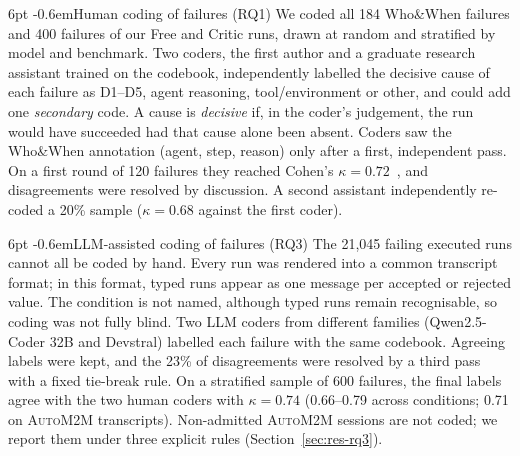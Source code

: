 \documentclass[pdflatex,sn-mathphys-num]{sn-jnl}
\makeatletter
\theoremstyle{thmstyleone}%
\theoremstyle{thmstyletwo}%
\theoremstyle{thmstylethree}%
\newcommand{\auto}{\textsc{AutoM2M}}
\newcommand{\D}[1]{\textsf{D#1}}
\renewcommand\paragraph{\@startsection{paragraph}{4}{\z@}%
  {6pt \@plus 2pt \@minus 1pt}{-0.6em}{\normalfont\normalsize\bfseries}}
\makeatother
\begin{document}
\paragraph{Human coding of failures (RQ1)} We coded all 184 Who\&When failures
and 400 failures of our Free and Critic runs, drawn at random and stratified by
model and benchmark. Two coders, the first author and a graduate research
assistant trained on the codebook, independently labelled the decisive cause of
each failure as \D{1}--\D{5}, agent reasoning, tool/environment or other, and
could add one \emph{secondary} code. A cause is \emph{decisive} if, in the
coder's judgement, the run would have succeeded had that cause alone been
absent. Coders saw the Who\&When annotation (agent,
step, reason) only after a first, independent pass. On a first round of 120
failures they reached Cohen's $\kappa=0.72$~\cite{cohen1960kappa}, and
disagreements were resolved by discussion. A second assistant independently
re-coded a 20\% sample ($\kappa=0.68$ against the first coder).

\paragraph{LLM-assisted coding of failures (RQ3)} The 21{,}045 failing executed
runs cannot all be coded by hand. Every run was rendered into a common
transcript format; in this format, typed runs appear as one message per
accepted or rejected value. The condition is not named, although typed runs
remain recognisable, so coding was not fully blind. Two LLM coders from
different families (Qwen2.5-Coder 32B and Devstral) labelled each failure with
the same codebook. Agreeing labels were kept, and the 23\% of disagreements
were resolved by a third pass with a fixed tie-break rule. On a stratified
sample of 600 failures, the final labels agree with the two human coders with
$\kappa=0.74$ (0.66--0.79 across conditions; 0.71 on \auto{} transcripts).
Non-admitted \auto{} sessions are not coded; we report them under three explicit
rules (Section~\ref{sec:res-rq3}).
\end{document}
